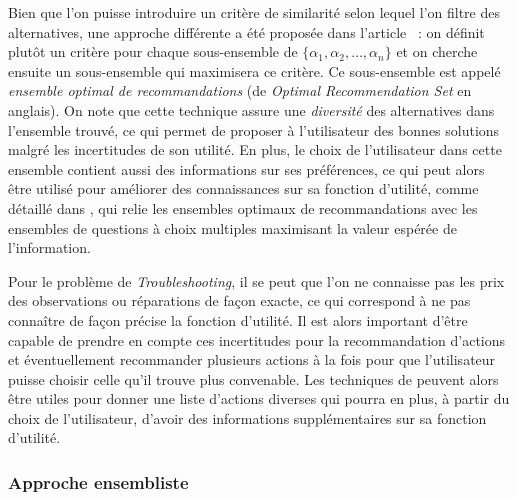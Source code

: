 \documentclass[a4paper,11pt]{article}
\theoremstyle{plain}
\begin{document}
Bien que l'on puisse introduire un critère de similarité selon lequel l'on filtre des alternatives, une approche différente a été proposée dans l'article \cite{price_optimal_2005}~: on définit plutôt un critère pour chaque sous-ensemble de $\{\alpha_1, \alpha_2, \dotsc, \alpha_n\}$ et on cherche ensuite un sous-ensemble qui maximisera ce critère. Ce sous-ensemble est appelé \emph{ensemble optimal de recommandations} (de \emph{Optimal Recommendation Set} en anglais). On note que cette technique assure une \emph{diversité} des alternatives dans l'ensemble trouvé, ce qui permet de proposer à l'utilisateur des bonnes solutions malgré les incertitudes de son utilité. En plus, le choix de l'utilisateur dans cette ensemble contient aussi des informations sur ses préférences, ce qui peut alors être utilisé pour améliorer des connaissances sur sa fonction d'utilité, comme détaillé dans \cite{viappiani_optimal_2005}, qui relie les ensembles optimaux de recommandations avec les ensembles de questions à choix multiples maximisant la valeur espérée de l'information. %

Pour le problème de \emph{Troubleshooting}, il se peut que l'on ne connaisse pas les prix des observations ou réparations de façon exacte, ce qui correspond à ne pas connaître de façon précise la fonction d'utilité. Il est alors important d'être capable de prendre en compte ces incertitudes pour la recommandation d'actions et éventuellement recommander plusieurs actions à la fois pour que l'utilisateur puisse choisir celle qu'il trouve plus convenable. Les techniques de \cite{price_optimal_2005, viappiani_optimal_2005} peuvent alors être utiles pour donner une liste d'actions diverses qui pourra en plus, à partir du choix de l'utilisateur, d'avoir des informations supplémentaires sur sa fonction d'utilité.

\subsubsection{Approche ensembliste}
\end{document}

